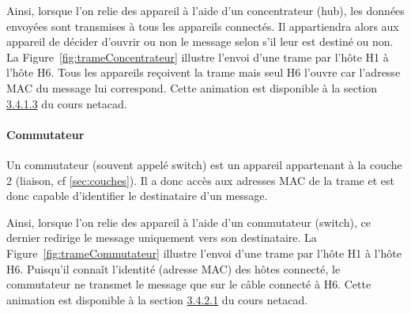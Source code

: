 Ainsi, lorsque l'on relie des appareil à l'aide d'un concentrateur (hub), les données envoyées sont transmises à tous les appareils connectés. Il appartiendra alors aux appareil de décider d'ouvrir ou non le message selon s'il leur est destiné ou non. La Figure~\ref{fig:trameConcentrateur} illustre l'envoi d'une trame par l'hôte H1 à l'hôte H6. Tous les appareils reçoivent la trame mais seul H6 l'ouvre car l'adresse MAC du message lui correspond. Cette animation est disponible à la section \href{https://static-course-assets.s3.amazonaws.com/NetEss/fr/index.html#3.4.1.3}{3.4.1.3} du cours netacad.




\paragraph{Commutateur}
Un commutateur (souvent appelé switch) est un appareil appartenant à la couche 2 (liaison, cf \ref{sec:couches}). Il a donc accès aux adresses MAC de la trame et est donc capable d'identifier le destinataire d'un message.

Ainsi, lorsque l'on relie des appareil à l'aide d'un commutateur (switch), ce dernier redirige le message uniquement vers son destinataire. La Figure~\ref{fig:trameCommutateur} illustre l'envoi d'une trame par l'hôte H1 à l'hôte H6. Puisqu'il connaît l'identité (adresse MAC) des hôtes connecté, le commutateur ne transmet le message que sur le câble connecté à H6. Cette animation est disponible à la section \href{https://static-course-assets.s3.amazonaws.com/NetEss/fr/index.html#3.4.2.1}{3.4.2.1} du cours netacad.



